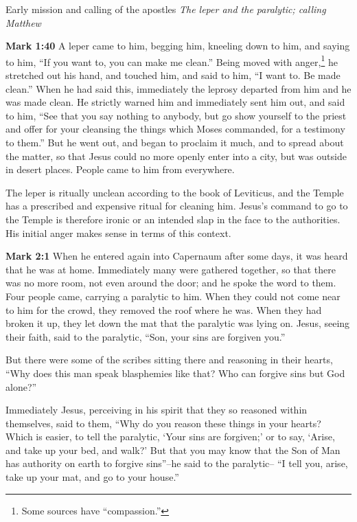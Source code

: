 \documentclass[10pt,twoside]{book}
\newcommand{\quotesize}{\normalsize{}}
\newcommand{\comm}[1]{\begingroup \color{black!50} #1\endgroup}
\newenvironment{quotetext}{\begingroup\quotesize}{\endgroup}
\newcommand{\bible}[2]{\begin{quotetext}\textbf{#1} #2\end{quotetext}}
\newcommand{\gospelmark}[2]{\bible{Mark #1}{#2}}
\newcommand{\subhead}[1]{\emph{#1}\par}
\begin{document}
\begin{section}{Early mission and calling of the apostles}
\subhead{The leper and the paralytic; calling Matthew}

\gospelmark{1:40}{A leper came to him, begging him, kneeling down to him, and saying to him, ``If you want to, you can make me clean.''
  Being moved with anger,\footnote{Some sources have ``compassion.''} he stretched out his hand, and touched him, and said to him, ``I want to. Be made clean.''   When he had said this, immediately the leprosy departed from him and he was made clean.   He strictly warned him and immediately sent him out,   and said to him, ``See that you say nothing to anybody, but go show yourself to the priest and offer for your cleansing the things which Moses commanded, for a testimony to them.''
  But he went out, and began to proclaim it much, and to spread about the matter, so that Jesus could no more openly enter into a city, but was outside in desert places. People came to him from everywhere. }

\comm{
The leper is ritually unclean according to the book of Leviticus, and the Temple has a prescribed
and expensive ritual for cleaning him. Jesus's command to go to the Temple is therefore ironic
or an intended slap in the face to the authorities. His initial anger makes sense in terms of this context.
}

\gospelmark{2:1}{When he entered again into Capernaum after some days, it was heard that he was at home.   Immediately many were gathered together, so that there was no more room, not even around the door; and he spoke the word to them.   Four people came, carrying a paralytic to him.   When they could not come near to him for the crowd, they removed the roof where he was. When they had broken it up, they let down the mat that the paralytic was lying on.   Jesus, seeing their faith, said to the paralytic, ``Son, your sins are forgiven you.''

  But there were some of the scribes sitting there and reasoning in their hearts,   ``Why does this man speak blasphemies like that? Who can forgive sins but God alone?''

  Immediately Jesus, perceiving in his spirit that they so reasoned within themselves, said to them, ``Why do you reason these things in your hearts?    Which is easier, to tell the paralytic, `Your sins are forgiven;' or to say, `Arise, and take up your bed, and walk?'    But that you may know that the Son of Man has authority on earth to forgive sins''--he said to the paralytic--    ``I tell you, arise, take up your mat, and go to your house.'' 

}
\end{section}
\end{document}
